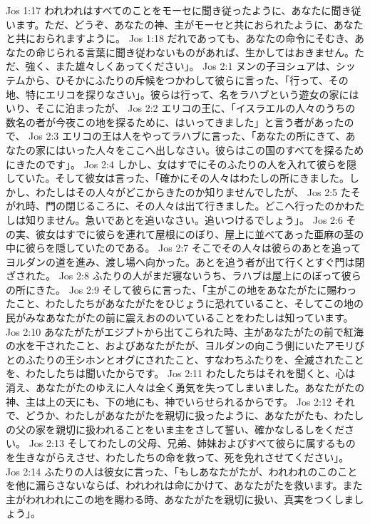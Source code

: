 Jos 1:17  われわれはすべてのことをモーセに聞き従ったように、あなたに聞き従います。ただ、どうぞ、あなたの神、主がモーセと共におられたように、あなたと共におられますように。
Jos 1:18  だれであっても、あなたの命令にそむき、あなたの命じられる言葉に聞き従わないものがあれば、生かしてはおきません。ただ、強く、また雄々しくあってください」。
Jos 2:1  ヌンの子ヨシュアは、シッテムから、ひそかにふたりの斥候をつかわして彼らに言った、「行って、その地、特にエリコを探りなさい」。彼らは行って、名をラハブという遊女の家にはいり、そこに泊まったが、
Jos 2:2  エリコの王に、「イスラエルの人々のうちの数名の者が今夜この地を探るために、はいってきました」と言う者があったので、
Jos 2:3  エリコの王は人をやってラハブに言った、「あなたの所にきて、あなたの家にはいった人々をここへ出しなさい。彼らはこの国のすべてを探るためにきたのです」。
Jos 2:4  しかし、女はすでにそのふたりの人を入れて彼らを隠していた。そして彼女は言った、「確かにその人々はわたしの所にきました。しかし、わたしはその人々がどこからきたのか知りませんでしたが、
Jos 2:5  たそがれ時、門の閉じるころに、その人々は出て行きました。どこへ行ったのかわたしは知りません。急いであとを追いなさい。追いつけるでしょう」。
Jos 2:6  その実、彼女はすでに彼らを連れて屋根にのぼり、屋上に並べてあった亜麻の茎の中に彼らを隠していたのである。
Jos 2:7  そこでその人々は彼らのあとを追ってヨルダンの道を進み、渡し場へ向かった。あとを追う者が出て行くとすぐ門は閉ざされた。
Jos 2:8  ふたりの人がまだ寝ないうち、ラハブは屋上にのぼって彼らの所にきた。
Jos 2:9  そして彼らに言った、「主がこの地をあなたがたに賜わったこと、わたしたちがあなたがたをひじょうに恐れていること、そしてこの地の民がみなあなたがたの前に震えおののいていることをわたしは知っています。
Jos 2:10  あなたがたがエジプトから出てこられた時、主があなたがたの前で紅海の水を干されたこと、およびあなたがたが、ヨルダンの向こう側にいたアモリびとのふたりの王シホンとオグにされたこと、すなわちふたりを、全滅されたことを、わたしたちは聞いたからです。
Jos 2:11  わたしたちはそれを聞くと、心は消え、あなたがたのゆえに人々は全く勇気を失ってしまいました。あなたがたの神、主は上の天にも、下の地にも、神でいらせられるからです。
Jos 2:12  それで、どうか、わたしがあなたがたを親切に扱ったように、あなたがたも、わたしの父の家を親切に扱われることをいま主をさして誓い、確かなしるしをください。
Jos 2:13  そしてわたしの父母、兄弟、姉妹およびすべて彼らに属するものを生きながらえさせ、わたしたちの命を救って、死を免れさせてください」。
Jos 2:14  ふたりの人は彼女に言った、「もしあなたがたが、われわれのこのことを他に漏らさないならば、われわれは命にかけて、あなたがたを救います。また主がわれわれにこの地を賜わる時、あなたがたを親切に扱い、真実をつくしましょう」。
